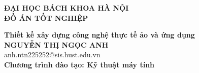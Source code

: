 \documentclass[DoAn.tex]{subfiles}
\begin{document}
\begin{titlepage}
\thispagestyle{empty}
\begin{center}

{\textbf{\large{ĐẠI HỌC BÁCH KHOA HÀ NỘI}}}\\[4cm]

{\textbf{\huge{ ĐỒ ÁN TỐT NGHIỆP}}}\\[1cm]
{\textbf{\Large{Thiết kế xây dựng công nghệ thực tế ảo và ứng dụng}}\\[1cm]

{\textbf{\large{NGUYỄN THỊ NGỌC ANH}}}\\
{\large{anh.ntn225252@sis.hust.edu.vn}}\\[0.5cm]

{\textbf{\large{Chương trình đào tạo: Kỹ thuật máy tính
}}}\\

\vspace{4cm}
\begin{table}[H]
\centering
{}
\end{table}}
\end{center}



\end{titlepage}
\end{document}
